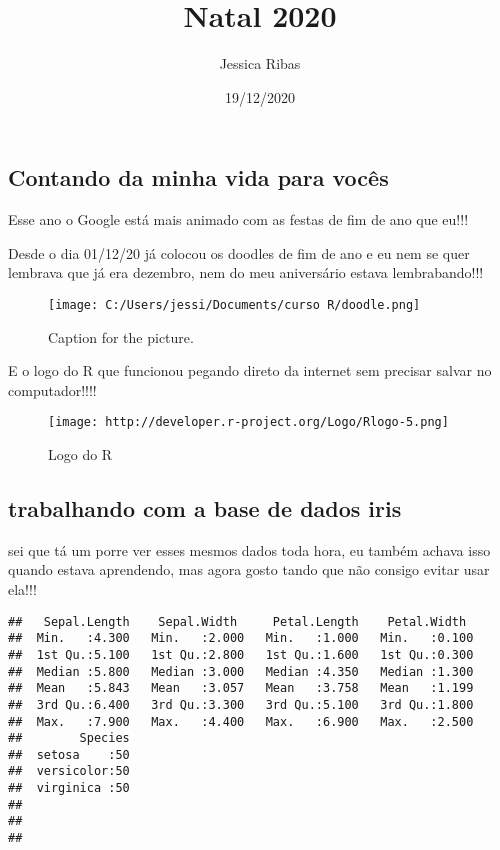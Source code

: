 \documentclass[
]{article}
\title{Natal 2020}
\author{Jessica Ribas}
\date{19/12/2020}
\begin{document}
\maketitle

\hypertarget{contando-da-minha-vida-para-vocuxeas}{%
\subsection{Contando da minha vida para
vocês}\label{contando-da-minha-vida-para-vocuxeas}}

Esse ano o Google está mais animado com as festas de fim de ano que
eu!!!

Desde o dia 01/12/20 já colocou os doodles de fim de ano e eu nem se
quer lembrava que já era dezembro, nem do meu aniversário estava
lembrabando!!!

\begin{figure}
\centering
\texttt{[image: C:/Users/jessi/Documents/curso R/doodle.png]}
\caption{Caption for the picture.}
\end{figure}

E o logo do R que funcionou pegando direto da internet sem precisar
salvar no computador!!!!

\begin{figure}
\centering
\texttt{[image: http://developer.r-project.org/Logo/Rlogo-5.png]}
\caption{Logo do R}
\end{figure}

\hypertarget{trabalhando-com-a-base-de-dados-iris}{%
\subsection{trabalhando com a base de dados
iris}\label{trabalhando-com-a-base-de-dados-iris}}

sei que tá um porre ver esses mesmos dados toda hora, eu também achava
isso quando estava aprendendo, mas agora gosto tando que não consigo
evitar usar ela!!!

\begin{verbatim}
##   Sepal.Length    Sepal.Width     Petal.Length    Petal.Width   
##  Min.   :4.300   Min.   :2.000   Min.   :1.000   Min.   :0.100  
##  1st Qu.:5.100   1st Qu.:2.800   1st Qu.:1.600   1st Qu.:0.300  
##  Median :5.800   Median :3.000   Median :4.350   Median :1.300  
##  Mean   :5.843   Mean   :3.057   Mean   :3.758   Mean   :1.199  
##  3rd Qu.:6.400   3rd Qu.:3.300   3rd Qu.:5.100   3rd Qu.:1.800  
##  Max.   :7.900   Max.   :4.400   Max.   :6.900   Max.   :2.500  
##        Species  
##  setosa    :50  
##  versicolor:50  
##  virginica :50  
##                 
##                 
## 
\end{verbatim}
\end{document}
